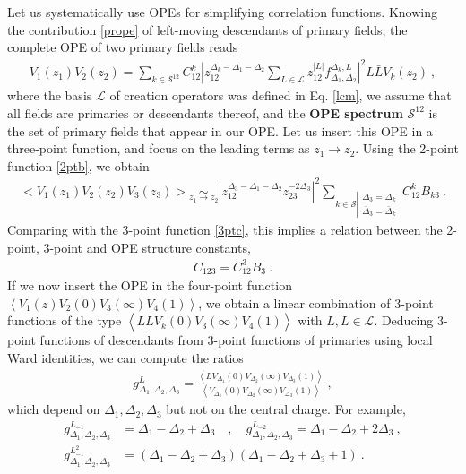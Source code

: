 \documentclass[12pt, a4paper]{article}
\newcommand{\myindex}[1]{\textbf{\boldmath #1}}
\theoremstyle{break}
\begin{document}
Let us systematically use OPEs for simplifying correlation functions. Knowing the contribution \eqref{prope} of left-moving descendants of primary fields, the complete OPE of two primary fields reads 
\begin{align}
 V_1(z_1)V_2(z_2) = \sum_{k\in\mathcal{S}^{12}} C_{12}^k \left|z_{12}^{\Delta_k-\Delta_1-\Delta_2}\sum_{L\in\mathcal{L}} z_{12}^{|L|}f_{\Delta_1,\Delta_2}^{\Delta_k,L}\right|^2 L\bar L V_k(z_2)\ ,
 \label{tope}
\end{align}
where the basis $\mathcal{L}$ of creation operators was defined in Eq. \eqref{lcm},
we assume that all fields are primaries or descendants thereof, and the \myindex{OPE spectrum} $\mathcal{S}^{12}$ is the set of primary fields that appear in our OPE. Let us insert this OPE in a three-point function, and focus on the leading terms as $z_1\to z_2$. Using the 2-point function \eqref{2ptb}, we obtain
\begin{align}
  \Big< V_1(z_1)V_2(z_2)V_3(z_3) \Big> \underset{z_1\to z_2}{\sim} 
  \left|z_{12}^{\Delta_3-\Delta_1-\Delta_2}z_{23}^{-2\Delta_3}\right|^2 
  \sum_{k\in\mathcal{S}\left|\substack{\Delta_3=\Delta_k\\ \bar{\Delta}_3=\bar\Delta_k}\right. }
  C_{12}^k B_{k3}\ .
\end{align}
Comparing with the 3-point function \eqref{3ptc}, this implies a relation between the 2-point, 3-point and OPE structure constants,
\begin{align}
 \boxed{C_{123} = C_{12}^3B_{3}} \ .
 \label{ccb}
\end{align}
If we now insert the OPE in the four-point function $\left<V_1(z)V_2(0)V_3(\infty)V_4(1)\right>$, we obtain a linear combination of 3-point functions of the type $\left<L\bar{L}V_k(0) V_3(\infty)V_4(1)\right>$ with $L,\bar L\in\mathcal{L}$. Deducing 3-point functions of descendants from 3-point functions of primaries using local Ward identities, we can compute the ratios
\begin{align}
 g^L_{\Delta_1,\Delta_2,\Delta_3} = \frac{\left< LV_{\Delta_1}(0) V_{\Delta_2}(\infty)V_{\Delta_3}(1)\right>}{\left< V_{\Delta_1}(0) V_{\Delta_2}(\infty)V_{\Delta_3}(1)\right>}\ ,
 \label{gl}
\end{align}
which depend on $\Delta_1,\Delta_2,\Delta_3$ but not on the central charge. For example, 
\begin{align}
 g^{L_{-1}}_{\Delta_1,\Delta_2,\Delta_3}&= \Delta_1-\Delta_2+\Delta_3 \quad , \quad g^{L_{-2}}_{\Delta_1,\Delta_2,\Delta_3}= \Delta_1-\Delta_2+2\Delta_3 \ , 
 \label{gl12}
 \\
 g^{L_{-1}^2}_{\Delta_1,\Delta_2,\Delta_3}&= \left(\Delta_1-\Delta_2+\Delta_3\right)\left(\Delta_1-\Delta_2+\Delta_3+1\right) \ .
 \label{gl11}
\end{align}
\end{document}

